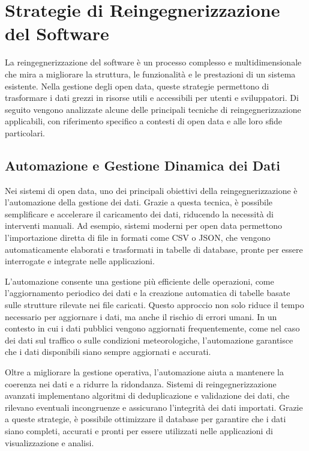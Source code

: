 \section{Strategie di Reingegnerizzazione del Software}

La reingegnerizzazione del software è un processo complesso e multidimensionale che mira a migliorare la struttura, le funzionalità e le prestazioni di un sistema esistente. Nella gestione degli open data, queste strategie permettono di trasformare i dati grezzi in risorse utili e accessibili per utenti e sviluppatori. Di seguito vengono analizzate alcune delle principali tecniche di reingegnerizzazione applicabili, con riferimento specifico a contesti di open data e alle loro sfide particolari.

\subsection{Automazione e Gestione Dinamica dei Dati}

Nei sistemi di open data, uno dei principali obiettivi della reingegnerizzazione è l’automazione della gestione dei dati. Grazie a questa tecnica, è possibile semplificare e accelerare il caricamento dei dati, riducendo la necessità di interventi manuali. Ad esempio, sistemi moderni per open data permettono l'importazione diretta di file in formati come CSV o JSON, che vengono automaticamente elaborati e trasformati in tabelle di database, pronte per essere interrogate e integrate nelle applicazioni.

L’automazione consente una gestione più efficiente delle operazioni, come l'aggiornamento periodico dei dati e la creazione automatica di tabelle basate sulle strutture rilevate nei file caricati. Questo approccio non solo riduce il tempo necessario per aggiornare i dati, ma anche il rischio di errori umani. In un contesto in cui i dati pubblici vengono aggiornati frequentemente, come nel caso dei dati sul traffico o sulle condizioni meteorologiche, l'automazione garantisce che i dati disponibili siano sempre aggiornati e accurati.

Oltre a migliorare la gestione operativa, l'automazione aiuta a mantenere la coerenza nei dati e a ridurre la ridondanza. Sistemi di reingegnerizzazione avanzati implementano algoritmi di deduplicazione e validazione dei dati, che rilevano eventuali incongruenze e assicurano l’integrità dei dati importati. Grazie a queste strategie, è possibile ottimizzare il database per garantire che i dati siano completi, accurati e pronti per essere utilizzati nelle applicazioni di visualizzazione e analisi.

